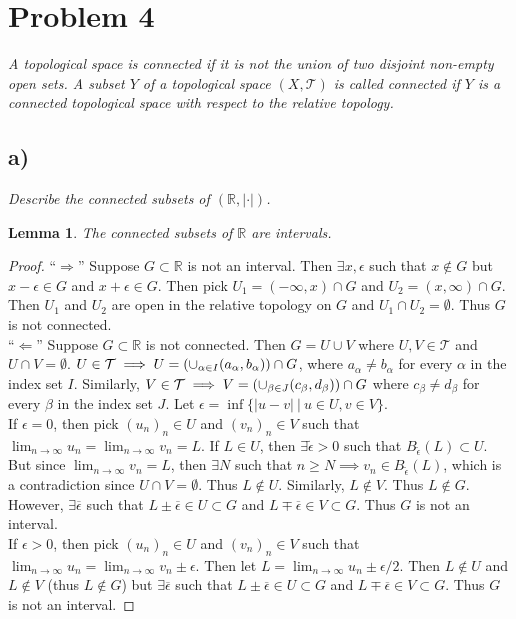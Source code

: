 \documentclass[12pt]{article}
\theoremstyle{plain}
\newtheorem{lemma}{Lemma}
\begin{document}
\section*{Problem 4}
\emph{A topological space is \emph{connected} if it is not the union of two disjoint non-empty open sets.  A subset $Y$ of a topological space $(X, \mathcal{T})$ is called connected if $Y$ is a connected topological space with respect to the relative topology.}

\subsection*{ a)}
\emph{Describe the connected subsets of $(\mathbb{R}, |\cdot|)$.}

\begin{lemma}
    \label{connected_subsets_of_R}
    The connected subsets of $\mathbb{R}$ are intervals.
\end{lemma}
\begin{proof}
    ``$\Longrightarrow$'' Suppose $G \subset \mathbb{R}$ is not an interval.  Then $\exists x,\epsilon$ such that $x \not\in G$ but $x - \epsilon \in G$ and $x + \epsilon \in G$.  Then pick $U_1 = (-\infty, x) \cap G$ and $U_2 = (x, \infty) \cap G$.  Then $U_1$ and $U_2$ are open in the relative topology on $G$ and $U_1 \cap U_2 = \emptyset$.  Thus $G$ is not connected.\\

    \noindent``$\Longleftarrow$'' Suppose $G \subset \mathbb{R}$ is not connected.  Then $G = U\cup V$ where $U,V\in \mathcal{T}$ and $U\cap V = \emptyset$.  $U \in \mathcal{T} \implies U = \qty(\cup_{\alpha \in I} (a_\alpha, b_\alpha)) \cap G$, where $a_\alpha \neq b_\alpha$ for every $\alpha$ in the index set $I$.  Similarly, $V \in \mathcal{T} \implies V = \qty(\cup_{\beta\in J}(c_\beta, d_\beta)) \cap G$ where $c_\beta \neq d_\beta$ for every $\beta$ in the index set $J$.  Let $\epsilon = \inf\{|u - v|\ |\ u \in U, v\in V\}$.\\

    \noindent If $\epsilon = 0$, then pick $(u_n)_n \in U$ and $(v_n)_n \in V$ such that $\lim_{n\rightarrow\infty}u_n = \lim_{n\rightarrow\infty}v_n = L$.  If $L \in U$, then $\exists \tilde\epsilon > 0$ such that $B_{\tilde\epsilon}(L) \subset U$.  But since $\lim_{n\rightarrow\infty}v_n = L$, then $\exists N$ such that $n \geq N \implies v_n \in B_{\tilde\epsilon}(L)$, which is a contradiction since $U \cap V = \emptyset$.  Thus $L \not\in U$.  Similarly, $L \not\in V$.  Thus $L \not\in G$.  However, $\exists \overline{\epsilon}$ such that $L \pm \overline{\epsilon} \in U \subset G$ and $L \mp \overline{\epsilon} \in V \subset G$.  Thus $G$ is not an interval. \\

    \noindent If $\epsilon > 0$, then pick $(u_n)_n \in U$ and $(v_n)_n \in V$ such that $\lim_{n\rightarrow\infty}u_n = \lim_{n\rightarrow\infty}v_n \pm \epsilon$.  Then let $L = \lim_{n\rightarrow\infty}u_n \pm \epsilon/2$.  Then $L \not\in U$ and $L \not\in V$ (thus $L \not\in G$) but $\exists \overline{\epsilon}$ such that $L \pm \overline{\epsilon} \in U \subset G$ and $L \mp \overline{\epsilon} \in V \subset G$.  Thus $G$ is not an interval.
\end{proof}
\end{document}
